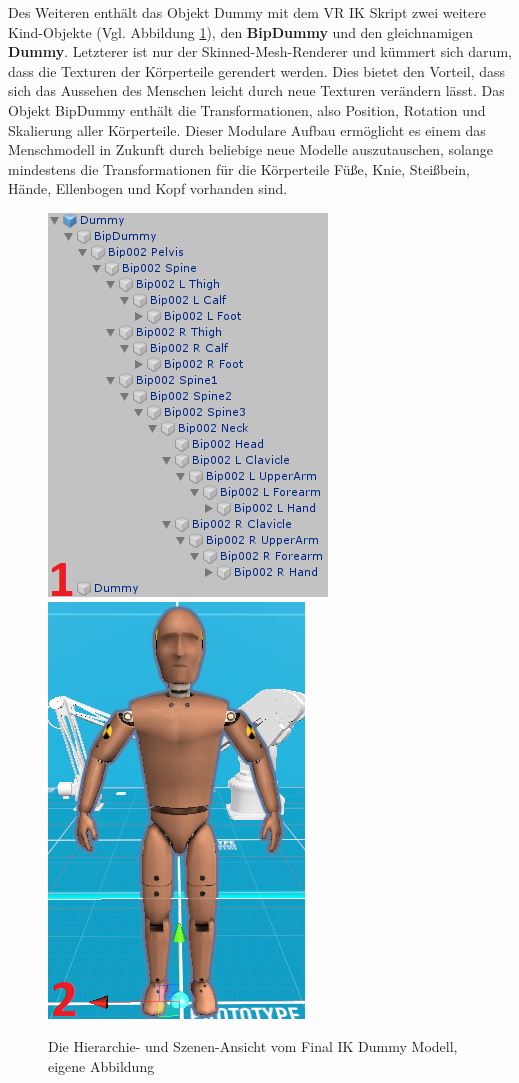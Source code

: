\newline
Des Weiteren enthält das Objekt Dummy mit dem VR IK Skript zwei weitere Kind-Objekte (Vgl. Abbildung \ref{fig:Dummy}), den \textbf{BipDummy} und den gleichnamigen \textbf{Dummy}. Letzterer ist nur der Skinned-Mesh-Renderer und kümmert sich darum, dass die Texturen der Körperteile gerendert werden. Dies bietet den Vorteil, dass sich das Aussehen des Menschen leicht durch neue Texturen verändern lässt. Das Objekt BipDummy enthält die Transformationen, also Position, Rotation und Skalierung aller Körperteile. Dieser Modulare Aufbau ermöglicht es einem das Menschmodell in Zukunft durch beliebige neue Modelle auszutauschen, solange mindestens die Transformationen für die Körperteile Füße, Knie, Steißbein, Hände, Ellenbogen und Kopf vorhanden sind.
\begin{figure}[h]
	\centering
	\includegraphics[width=0.35\linewidth]{Bilder/A34_DummyAufbau2}
	\includegraphics[width=0.296\linewidth]{Bilder/A35_Dummy2}
	\caption{Die Hierarchie- und Szenen-Ansicht vom Final IK Dummy Modell, eigene Abbildung}
	\label{fig:Dummy}
\end{figure}
\newpage

